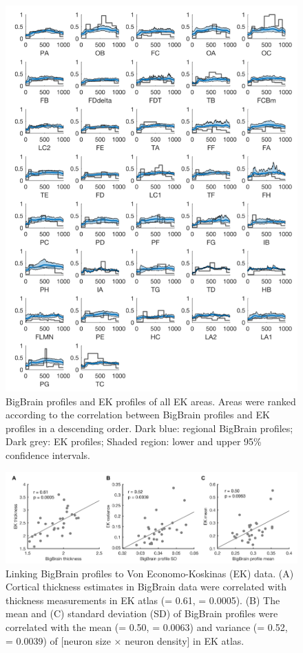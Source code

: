 \begin{refsection}
\begin{figure}[H]
    \centering
    \includegraphics[width=\linewidth]{images/bbFigureS2.png}   
    \caption{BigBrain profiles and EK profiles of all EK areas. Areas were ranked according to the correlation between BigBrain profiles and EK profiles in a descending order. Dark blue: regional BigBrain profiles; Dark grey: EK profiles; Shaded region: lower and upper 95\% confidence intervals.}
    \label{bigbrainFigS2}
\end{figure}

\begin{figure}[H]
    \centering
    \includegraphics[width=\linewidth]{images/bbFigureS3.png}   
    \caption{Linking BigBrain profiles to Von Economo-Koskinas (EK) data. (A) Cortical thickness estimates in BigBrain data were correlated with thickness measurements in EK atlas (\rval = 0.61, \pval = 0.0005). (B) The mean and (C) standard deviation (SD) of BigBrain profiles were correlated with the mean (\rval = 0.50, \pval = 0.0063) and variance (\rval = 0.52, \pval = 0.0039) of [neuron size × neuron density] in EK atlas.}
    \label{bigbrainFigS3}
\end{figure}


\end{refsection}
